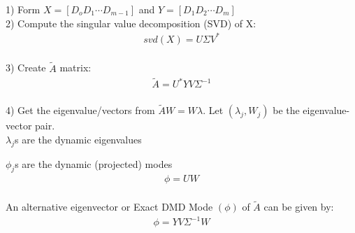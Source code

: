 \documentclass{article}
\begin{document}
1) Form $X=[D_o D_1 \cdots D_{m-1}]$ and $Y=[D_1 D_2 \cdots D_m]$\\

2) Compute the singular value decomposition (SVD) of X:
\begin{align*}
svd(X) = U\Sigma V^*
\end{align*}\\

3) Create $\tilde{A}$ matrix:
\begin{align*}
\tilde{A}=U^*YV\Sigma ^{-1}
\end{align*}\\

4) Get the eigenvalue/vectors from $\tilde{A}W=W\lambda$. Let $(\lambda_j,W_j)$ be the eigenvalue-vector pair.\\

$\lambda_j$s are the dynamic eigenvalues\

$\phi_j$s are the dynamic (projected) modes\\

\begin{align*}
\phi=UW
\end{align*}\\

An alternative eigenvector or Exact DMD Mode $(\phi)$ of $\tilde{A}$ can be given by:
\begin{align*}
\phi = YV\Sigma^{-1}W
\end{align*}
\end{document}
